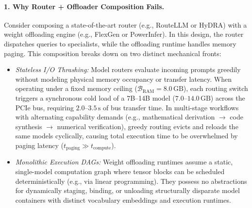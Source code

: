\paragraph{1. Why Router + Offloader Composition Fails.}
Consider composing a state-of-the-art router (e.g., RouteLLM or HyDRA) with a weight offloading engine (e.g., FlexGen or PowerInfer). In this design, the router dispatches queries to specialists, while the offloading runtime handles memory paging. This composition breaks down on two distinct mechanical fronts:
\begin{itemize}
    \item \textit{Stateless I/O Thrashing:} Model routers evaluate incoming prompts greedily without modeling physical memory occupancy or transfer latency. When operating under a fixed memory ceiling ($\mathcal{B}_{\text{RAM}} = 8.0\,\text{GB}$), each routing switch triggers a synchronous cold load of a 7B--14B model ($7.0$--$14.0\,\text{GB}$) across the PCIe bus, requiring $2.0$--$3.5\,\text{s}$ of bus transfer time. In multi-stage workflows with alternating capability demands (e.g., mathematical derivation $\to$ code synthesis $\to$ numerical verification), greedy routing evicts and reloads the same models cyclically, causing total execution time to be overwhelmed by paging latency ($t_{\text{paging}} \gg t_{\text{compute}}$).
    \item \textit{Monolithic Execution DAGs:} Weight offloading runtimes assume a static, single-model computation graph where tensor blocks can be scheduled deterministically (e.g., via linear programming). They possess no abstractions for dynamically staging, binding, or unloading structurally disparate model containers with distinct vocabulary embeddings and execution runtimes.
\end{itemize}

